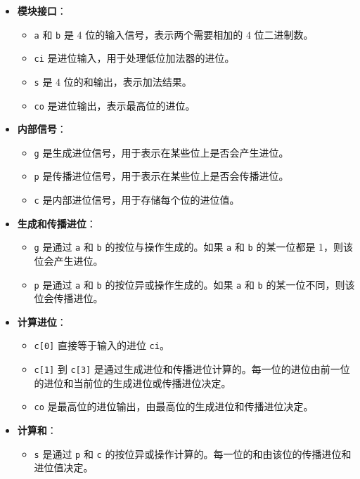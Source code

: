\documentclass[12pt,hyperref,a4paper,UTF8]{ctexart}
\begin{document}
\begin{itemize}
    \item \textbf{模块接口}：
    \begin{itemize}
        \item \texttt{a} 和 \texttt{b} 是 4 位的输入信号，表示两个需要相加的 4 位二进制数。
        \item \texttt{ci} 是进位输入，用于处理低位加法器的进位。
        \item \texttt{s} 是 4 位的和输出，表示加法结果。
        \item \texttt{co} 是进位输出，表示最高位的进位。
    \end{itemize}
    \item \textbf{内部信号}：
    \begin{itemize}
        \item \texttt{g} 是生成进位信号，用于表示在某些位上是否会产生进位。
        \item \texttt{p} 是传播进位信号，用于表示在某些位上是否会传播进位。
        \item \texttt{c} 是内部进位信号，用于存储每个位的进位值。
    \end{itemize}
    \item \textbf{生成和传播进位}：
    \begin{itemize}
        \item \texttt{g} 是通过 \texttt{a} 和 \texttt{b} 的按位与操作生成的。如果 \texttt{a} 和 \texttt{b} 的某一位都是 1，则该位会产生进位。
        \item \texttt{p} 是通过 \texttt{a} 和 \texttt{b} 的按位异或操作生成的。如果 \texttt{a} 和 \texttt{b} 的某一位不同，则该位会传播进位。
    \end{itemize}
    \item \textbf{计算进位}：
    \begin{itemize}
        \item \texttt{c[0]} 直接等于输入的进位 \texttt{ci}。
        \item \texttt{c[1]} 到 \texttt{c[3]} 是通过生成进位和传播进位计算的。每一位的进位由前一位的进位和当前位的生成进位或传播进位决定。
        \item \texttt{co} 是最高位的进位输出，由最高位的生成进位和传播进位决定。
    \end{itemize}
    \item \textbf{计算和}：
    \begin{itemize}
        \item \texttt{s} 是通过 \texttt{p} 和 \texttt{c} 的按位异或操作计算的。每一位的和由该位的传播进位和进位值决定。
    \end{itemize}
\end{itemize}
\end{document}
